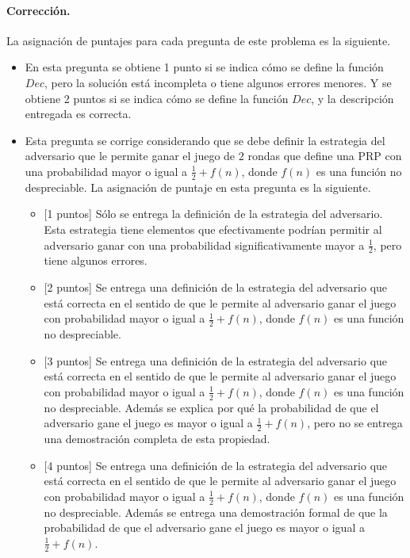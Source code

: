 \paragraph{Corrección.} La asignación de puntajes para cada pregunta de este problema es la siguiente.
\begin{itemize}
\item[(a)] En esta pregunta se obtiene 1 punto si se indica cómo se define la función $\textit{Dec}$, pero la solución está incompleta o tiene algunos errores menores. Y se obtiene 2 puntos si se indica cómo se define la función $\textit{Dec}$, y la descripción entregada es correcta. 

\item[(b)] Esta pregunta se corrige considerando que se debe definir la
estrategia del adversario que le permite ganar el juego de $2$ rondas
que define una PRP con una probabilidad mayor o igual a $\frac{1}{2} +
f(n)$, donde $f(n)$ es una función no despreciable. La asignación de
puntaje en esta pregunta es la siguiente.
\begin{itemize}
    \item{[1 puntos]} Sólo se entrega la definición de la estrategia
    del adversario. Esta estrategia tiene elementos que efectivamente
    podrían permitir al adversario ganar con una probabilidad
    significativamente mayor a $\frac{1}{2}$, pero tiene algunos
    errores.

    \item{[2 puntos]} Se entrega una definición de la estrategia del
    adversario que está correcta en el sentido de que le permite al
    adversario ganar el juego con probabilidad mayor o igual a
    $\frac{1}{2} + f(n)$, donde $f(n)$ es una función no despreciable.

    \item{[3 puntos]} Se entrega una definición de la estrategia del
    adversario que está correcta en el sentido de que le permite al
    adversario ganar el juego con probabilidad mayor o igual a
    $\frac{1}{2} + f(n)$, donde $f(n)$ es una función no
    despreciable. Además se explica por qué la probabilidad de que el
    adversario gane el juego es mayor o igual a $\frac{1}{2}
    + f(n)$, pero no se entrega una demostración completa de
    esta propiedad.

    \item{[4 puntos]} Se entrega una definición de la estrategia del
    adversario que está correcta en el sentido de que le permite al
    adversario ganar el juego con probabilidad mayor o igual a
    $\frac{1}{2} + f(n)$, donde $f(n)$ es una función no
    despreciable. Además se entrega una demostración
    formal de que la probabilidad de que el adversario gane el juego
    es mayor o igual a $\frac{1}{2} + f(n)$.
\end{itemize}
\end{itemize}

